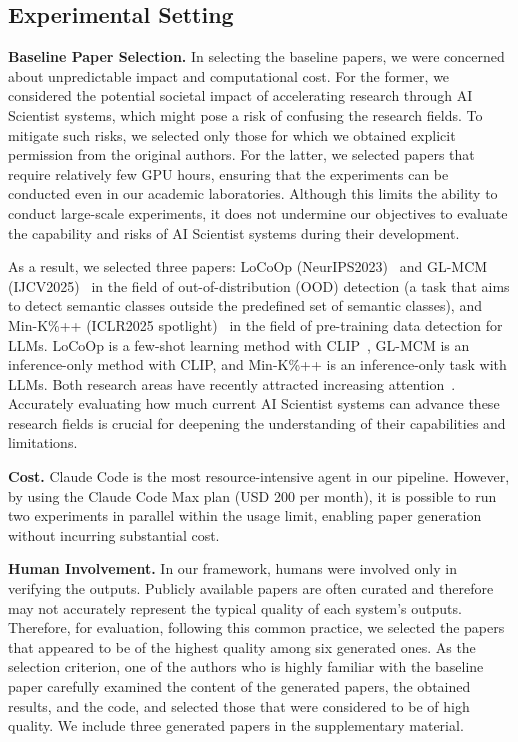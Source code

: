 \label{sec:experiment}
\subsection{Experimental Setting}
\textbf{Baseline Paper Selection.}
\label{subsec:baseline_selection}
In selecting the baseline papers, we were concerned about unpredictable impact and computational cost.
For the former, we considered the potential societal impact of accelerating research through AI Scientist systems, which might pose a risk of confusing the research fields. To mitigate such risks, we selected only those for which we obtained explicit permission from the original authors.
For the latter, we selected papers that require relatively few GPU hours, ensuring that the experiments can be conducted even in our academic laboratories. Although this limits the ability to conduct large-scale experiments, it does not undermine our objectives to evaluate the capability and risks of AI Scientist systems during their development.

As a result, we selected three papers: LoCoOp (NeurIPS2023)~\citep{miyai2023locoop} and GL-MCM (IJCV2025)~\citep{miyai2025gl} in the field of out-of-distribution (OOD) detection (a task that aims to detect semantic classes outside the predefined set of semantic classes), and Min-K\%++ (ICLR2025 spotlight)~\citep{zhang2024min} in the field of pre-training data detection for LLMs.
LoCoOp is a few-shot learning method with CLIP~\citep{radford2021learning}, GL-MCM is an inference-only method with CLIP, and Min-K\%++ is an inference-only task with LLMs.
Both research areas have recently attracted increasing attention~\citep{shi2023detecting, miyai2024generalized}. Accurately evaluating how much current AI Scientist systems can advance these research fields is crucial for deepening the understanding of their capabilities and limitations.

\textbf{Cost.}
Claude Code is the most resource-intensive agent in our pipeline. However, by using the Claude Code Max plan (USD 200 per month), it is possible to run two experiments in parallel within the usage limit, enabling paper generation without incurring substantial cost.

\textbf{Human Involvement.}
In our framework, humans were involved only in verifying the outputs.
Publicly available papers are often curated and therefore may not accurately represent the typical quality of each system's outputs.
Therefore, for evaluation, following this common practice, we selected the papers that appeared to be of the highest quality among six generated ones. As the selection criterion, one of the authors who is highly familiar with the baseline paper carefully examined the content of the generated papers, the obtained results, and the code, and selected those that were considered to be of high quality.
We include three generated papers in the supplementary material.



